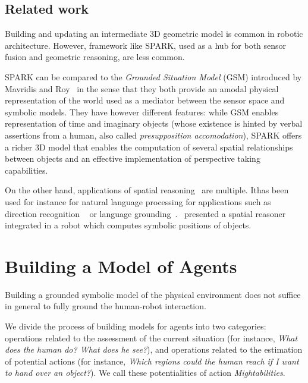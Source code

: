 \documentclass{svmult}
\begin{document}
\subsection{Related work}

Building and updating an intermediate 3D geometric model is common in robotic
architecture. However, framework like SPARK, used as a hub for both sensor
fusion and geometric reasoning, are less common.

SPARK can be compared to the \emph{Grounded Situation Model} (GSM) introduced
by Mavridis and Roy~\cite{Mavridis2005} in the sense that they both provide an
amodal physical representation of the world used as a mediator between the
sensor space and symbolic models. They have however different features: while
GSM enables representation of time and imaginary objects (whose existence is
hinted by verbal assertions from a human, also called \emph{presupposition
accomodation}), SPARK offers a richer 3D model that enables the computation of
several spatial relationships between objects and an effective implementation
of perspective taking capabilities.

On the other hand, applications of spatial reasoning~\cite{O'Keefe1999} are
multiple. Ithas been used for instance for natural language processing for
applications such as direction recognition ~\cite{Kollar2010,Matuszek2010} or
language grounding~\cite{Tellex2010}.~\cite{Skubic2004} presented a spatial
reasoner integrated in a robot which computes symbolic positions of objects.



\section{Building a Model of Agents}
\label{grounding_agents}

Building a grounded symbolic model of the physical environment does not suffice
in general to fully ground the human-robot interaction.

We divide the process of building models for agents into two categories:
operations related to the assessment of the current situation (for instance,
\emph{What does the human do? What does he see?}), and operations related to
the estimation of potential actions (for instance, \emph{Which regions could
the human reach if I want to hand over an object?}). We call these
potentialities of action \emph{Mightabilities}.
\end{document}
